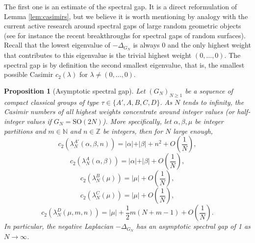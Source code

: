 \documentclass[11pt,a4paper,reqno]{article}
\newtheorem{proposition}[theorem]{Proposition}
\theoremstyle{definition}
\theoremstyle{remark}
\newcommand\SO{{\mathrm{SO}}}
\newcommand\Z{{\mathbb Z}}
\newcommand\N{{\mathbb N}}
\begin{document}
The first one is an estimate of the spectral gap. It is a direct reformulation of Lemma \ref{lem:casimirs}, but we believe it is worth mentioning by analogy with the current active research around spectral gaps of large random geometric objects (see for instance the recent breakthroughs \cite{HM23,AM1,AM2,HMT,HMT2} for spectral gaps of random surfaces). Recall that the lowest eigenvalue of $-\Delta_{G_N}$ is always 0 and the only highest weight that contributes to this eigenvalue is the trivial highest weight $(0,\ldots,0)$. The spectral gap is by definition the second smallest eigenvalue, that is, the smallest possible Casimir $c_2(\lambda)$ for $\lambda\neq(0,\ldots,0)$.

\begin{proposition}[Asymptotic spectral gap]\label{prop:spectral_gap}
Let $(G_N)_{N\geq 1}$ be a sequence of compact classical groups of type $\tau\in\{A',A,B,C,D\}$.
As $N$ tends to infinity, the Casimir numbers of all highest weights concentrate around integer values (or half-integer values if $G_N=\SO(2N)$). More specifically, let $\alpha,\beta,\mu$ be integer partitions and $m\in\N$ and $n\in\Z$ be integers, then for $N$ large enough,
\begin{equation}\nonumber
c_2(\lambda_N^{A'}(\alpha,\beta,n))=\vert\alpha\vert+\vert\beta\vert+n^2+O\left(\frac1N\right),
\end{equation}
\begin{equation}\nonumber
c_2(\lambda_N^{A}(\alpha,\beta))=\vert\alpha\vert+\vert\beta\vert+O\left(\frac1N\right),
\end{equation}
\begin{equation}\nonumber
c_2(\lambda_N^{B}(\mu))=\vert\mu\vert+O\left(\frac1N\right),
\end{equation}
\begin{equation}\nonumber
c_2(\lambda_N^{C}(\mu))=\vert\mu\vert+O\left(\frac1N\right),
\end{equation}
\begin{equation}\nonumber
c_2(\lambda_N^{D}(\mu,m,n))=\vert\mu\vert+\frac12m(N+m-1)+O\left(\frac1N\right).
\end{equation}
In particular, the negative Laplacian $-\Delta_{G_N}$ has an asymptotic spectral gap of 1 as $N\to\infty$.
\end{proposition}
\end{document}

